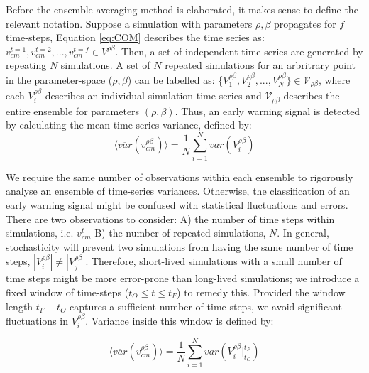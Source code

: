 Before the ensemble averaging method is elaborated, it makes sense to define the relevant notation.
Suppose a simulation with parameters $\rho, \beta$ propagates for $f$ time-steps, Equation \ref{eq:COM} describes the time series as: $v_{cm}^{t=1}, v_{cm}^{t=2},..., v_{cm}^{t=f} \in V^{\rho\beta}$. 
Then, a set of independent time series are generated by repeating $N$ simulations. 
A set of $N$ repeated simulations for an arbritrary point in the parameter-space ($\rho, \beta$) 
can be labelled as: \{$V_1^{\rho\beta}, V_2^{\rho \beta},..., V_N^{\rho\beta}\} \in \mathcal{V}_{\rho\beta}$, 
where each $V_i^{\rho\beta}$ describes an individual simulation time series and $\mathcal{V}_{\rho\beta}$ describes the entire ensemble for parameters $(\rho, \beta)$. 
Thus, an early warning signal is detected by calculating the mean time-series variance,
defined by:
\begin{equation}
\label{eq:ews_eq}
    \big\langle \overline{var}(v^{\rho\beta}_{cm}) \big\rangle = \frac{1}{N}\sum\limits_{i=1}^{N} var(V_i^{\rho\beta})
\end{equation}

We require the same number of observations within each ensemble to rigorously analyse an ensemble of time-series variances.
Otherwise, the classification of an early warning signal might be confused with statistical fluctuations and errors.
There are two observations to consider: 
A) the number of time steps within simulations, i.e. $v_{cm}^{t}$ 
B) the number of repeated simulations, $N$.
In general, stochasticity will prevent two simulations from having the same number of time steps, 
$|V_i^{\rho\beta}| \neq |V_j^{\rho\beta}|$.
Therefore, short-lived simulations with a small number of time steps might be more error-prone than long-lived simulations;
we introduce a fixed window of time-steps ($t_O\leq t \leq t_F$) to remedy this.
Provided the window length $t_F-t_O$ captures a sufficient number of time-steps, we avoid significant fluctuations in $V_i^{\rho\beta}$. 
Variance inside this window is defined by:

\begin{equation}
\label{eq:ews_eq1}
    \big\langle \overline{var}(v^{\rho\beta}_{cm}) \big\rangle = \frac{1}{N}\sum\limits_{i=1}^{N} var(V_i^{\rho\beta}\Big|^{t_F}_{t_O})
\end{equation}

